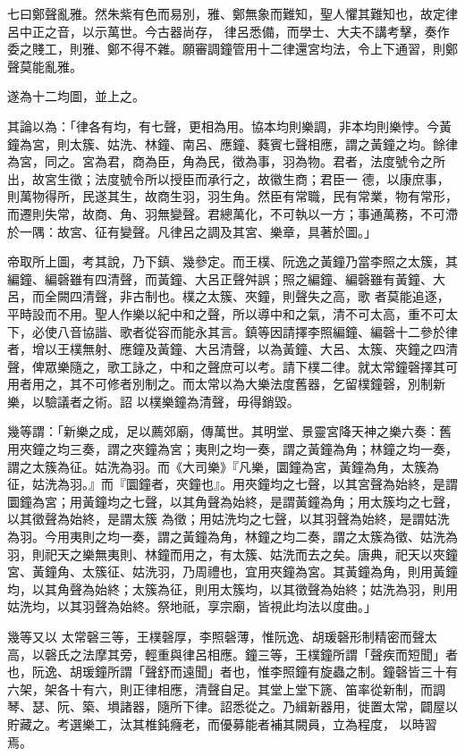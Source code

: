\begin{pinyinscope}
 七曰鄭聲亂雅。然朱紫有色而易別，雅、鄭無象而難知，聖人懼其難知也，故定律呂中正之音，以示萬世。今古器尚存，
 律呂悉備，而學士、大夫不講考擊，奏作委之賤工，則雅、鄭不得不雜。願審調鐘管用十二律還宮均法，令上下通習，則鄭聲莫能亂雅。



 遂為十二均圖，並上之。



 其論以為：「律各有均，有七聲，更相為用。協本均則樂調，非本均則樂悖。今黃鐘為宮，則太簇、姑洗、林鐘、南呂、應鐘、蕤賓七聲相應，謂之黃鐘之均。餘律為宮，同之。宮為君，商為臣，角為民，徵為事，羽為物。君者，法度號令之所出，故宮生徵；法度號令所以授臣而承行之，故徽生商；君臣一
 德，以康庶事，則萬物得所，民遂其生，故商生羽，羽生角。然臣有常職，民有常業，物有常形，而遷則失常，故商、角、羽無變聲。君總萬化，不可執以一方；事通萬務，不可滯於一隅：故宮、征有變聲。凡律呂之調及其宮、樂章，具著於圖。」



 帝取所上圖，考其說，乃下鎮、幾參定。而王樸、阮逸之黃鐘乃當李照之太簇，其編鐘、編磬雖有四清聲，而黃鐘、大呂正聲舛誤；照之編鐘、編磬雖有黃鐘、大呂，而全闕四清聲，非古制也。樸之太簇、夾鐘，則聲失之高，歌
 者莫能追逐，平時設而不用。聖人作樂以紀中和之聲，所以導中和之氣，清不可太高，重不可太下，必使八音協諧、歌者從容而能永其言。鎮等因請擇李照編鐘、編磬十二參於律者，增以王樸無射、應鐘及黃鐘、大呂清聲，以為黃鐘、大呂、太簇、夾鐘之四清聲，俾眾樂隨之，歌工詠之，中和之聲庶可以考。請下樸二律。就太常鐘磬擇其可用者用之，其不可修者別制之。而太常以為大樂法度舊器，乞留樸鐘磬，別制新樂，以驗議者之術。詔
 以樸樂鐘為清聲，毋得銷毀。



 幾等謂：「新樂之成，足以薦郊廟，傳萬世。其明堂、景靈宮降天神之樂六奏：舊用夾鐘之均三奏，謂之夾鐘為宮；夷則之均一奏，謂之黃鐘為角；林鐘之均一奏，謂之太簇為征。姑洗為羽。而《大司樂》『凡樂，圜鐘為宮，黃鐘為角，太簇為征，姑洗為羽。』而『圜鐘者，夾鐘也』。用夾鐘均之七聲，以其宮聲為始終，是謂圜鐘為宮；用黃鐘均之七聲，以其角聲為始終，是謂黃鐘為角；用太簇均之七聲，以其徵聲為始終，是謂太簇
 為徵；用姑洗均之七聲，以其羽聲為始終，是謂姑洗為羽。今用夷則之均一奏，謂之黃鐘為角，林鐘之均二奏，謂之太簇為徵、姑洗為羽，則祀天之樂無夷則、林鐘而用之，有太簇、姑洗而去之矣。唐典，祀天以夾鐘宮、黃鐘角、太簇征、姑洗羽，乃周禮也，宜用夾鐘為宮。其黃鐘為角，則用黃鐘均，以其角聲為始終；太簇為征，則用太簇均，以其徵聲為始終；姑洗為羽，則用姑洗均，以其羽聲為始終。祭地祇，享宗廟，皆視此均法以度曲。」



 幾等又以
 太常磬三等，王樸磬厚，李照磬薄，惟阮逸、胡瑗磬形制精密而聲太高，以磬氏之法摩其旁，輕重與律呂相應。鐘三等，王樸鐘所謂「聲疾而短聞」者也，阮逸、胡瑗鐘所謂「聲舒而遠聞」者也，惟李照鐘有旋蟲之制。鐘磬皆三十有六架，架各十有六，則正律相應，清聲自足。其堂上堂下篪、笛率從新制，而調琴、瑟、阮、築、塤諸器，隨所下律。詔悉從之。乃緝新器用，徙置太常，闢屋以貯藏之。考選樂工，汰其椎鈍癃老，而優募能者補其闕員，立為程度，
 以時習焉。




\end{pinyinscope}
